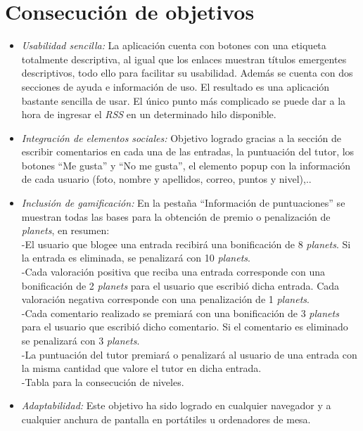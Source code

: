 \documentclass[a4paper, 12pt]{book}
\begin{document}
\section{Consecuci\'on de objetivos}
\label{sec:consecucion-objetivos}
\begin{itemize}
  \item \textit {Usabilidad sencilla:} La aplicaci\'on cuenta con botones con una etiqueta totalmente descriptiva, al 
  igual que los enlaces muestran t\'itulos emergentes descriptivos, todo ello para facilitar su usabilidad. Adem\'as se cuenta con dos 
  secciones de ayuda e informaci\'on de uso. El resultado es una aplicaci\'on bastante sencilla de usar. El \'unico punto m\'as complicado se puede dar a la hora de 
  ingresar el \textit{RSS} en un determinado hilo disponible.
  \item \textit {Integraci\'on de elementos sociales:} Objetivo logrado gracias a la secci\'on de escribir comentarios en cada una de las entradas, la puntuaci\'on del tutor, los 
  botones ``Me gusta'' y ``No me gusta'', el elemento popup con la informaci\'on de cada usuario (foto, nombre y apellidos, correo, puntos y nivel),..
  \item \textit {Inclusi\'on de gamificaci\'on:} En la pesta\~na ``Informaci\'on de puntuaciones'' se muestran todas las bases para la obtenci\'on de premio o 
  penalizaci\'on de \textit{planets}, en resumen:\\
  -El usuario que blogee una entrada recibir\'a una bonificaci\'on de 8 \textit{planets}. Si la entrada es eliminada, se penalizar\'a con 10 \textit{planets}.\\
  -Cada valoraci\'on positiva que reciba una entrada corresponde con una bonificaci\'on de 2 \textit{planets} para el usuario que escribi\'o dicha entrada. Cada valoraci\'on 
  negativa corresponde con una penalizaci\'on de 1 \textit{planets}.\\
  -Cada comentario realizado se premiar\'a con una bonificaci\'on de 3 \textit{planets} para el usuario que escribi\'o dicho comentario. Si el comentario es eliminado se 
  penalizar\'a con 3 \textit{planets}.\\
  -La puntuaci\'on del tutor premiar\'a o penalizar\'a al usuario de una entrada con la misma cantidad que valore el tutor en dicha entrada.\\
  -Tabla para la consecuci\'on de niveles.\\
  \item \textit {Adaptabilidad:} Este objetivo ha sido logrado en cualquier navegador y a cualquier anchura de pantalla en port\'atiles u ordenadores de mesa. 

\end{itemize}
\end{document}
